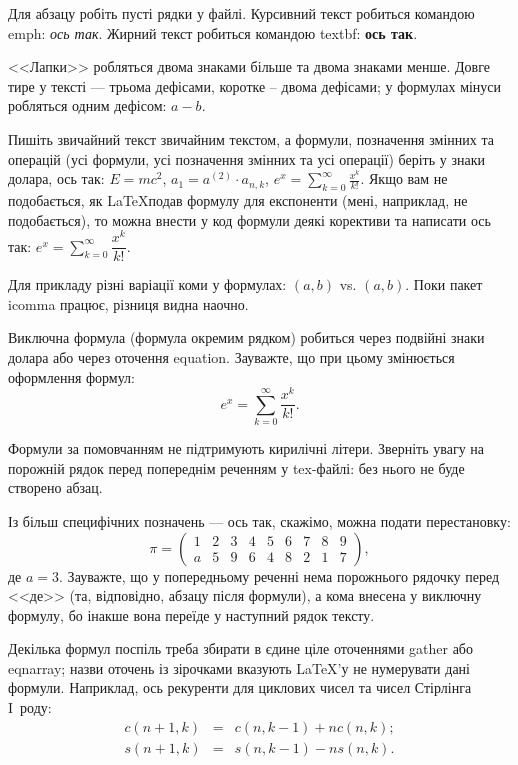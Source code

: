 Для абзацу робіть пусті рядки у файлі. Курсивний текст робиться командою
emph: \emph{ось так}. Жирний текст робиться командою textbf: \textbf{ось так}.

<<Лапки>> робляться двома знаками більше та двома знаками менше. Довге
тире у тексті --- трьома дефісами, коротке -- двома дефісами; у формулах
мінуси робляться одним дефісом: $a-b$.

Пишіть звичайний текст звичайним текстом, а формули, позначення змінних та
операцій (усі формули, усі позначення змінних та усі операції) беріть у
знаки долара, ось так: $E = mc^2$, $a_1 = a^{(2)} \cdot a_{n, k}$, $e^x =
    \sum_{k = 0}^{\infty} {\frac{x^k}{k!}}$. Якщо вам
не подобається, як \LaTeX подав формулу для експоненти (мені, наприклад,
не подобається), то можна внести у код формули деякі корективи та написати ось так: $e^x
    = \sum\limits_{k = 0}^{\infty} {\dfrac{x^k}{k!}}$.

Для прикладу різні варіації коми у формулах: $(a, b)$ vs. $(a,b)$. Поки
пакет icomma працює, різниця видна наочно.

Виключна формула (формула окремим рядком) робиться через подвійні знаки
долара або через оточення equation. Зауважте, що при цьому змінюється
оформлення формул:
$$e^x = \sum_{k = 0}^{\infty} {\frac{x^k}{k!}}.$$

Формули за помовчанням не підтримують кирилічні літери. Зверніть увагу на
порожній рядок перед попереднім реченням у tex-файлі: без нього не буде
створено абзац.

Із більш специфічних позначень --- ось так, скажімо, можна подати
перестановку:
$$\pi = \begin{pmatrix}
        1 & 2 & 3 & 4 & 5 & 6 & 7 & 8 & 9 \\
        a & 5 & 9 & 6 & 4 & 8 & 2 & 1 & 7
    \end{pmatrix},$$
де $a=3$. Зауважте, що у попередньому реченні нема порожнього рядочку
перед <<де>> (та, відповідно, абзацу після формули), а кома внесена у
виключну формулу, бо інакше вона переїде у наступний рядок тексту.

Декілька формул поспіль треба збирати в єдине ціле оточеннями gather або
eqnarray; назви оточень із зірочками вказують \LaTeX'у не нумерувати дані
формули. Наприклад, ось рекуренти для циклових чисел та чисел Стірлінга
I~роду:
\begin{eqnarray*}
    c(n+1, k) &=& c(n, k-1)+nc(n, k); \\
    s(n+1, k) &=& s(n, k-1)-ns(n, k).
\end{eqnarray*}


